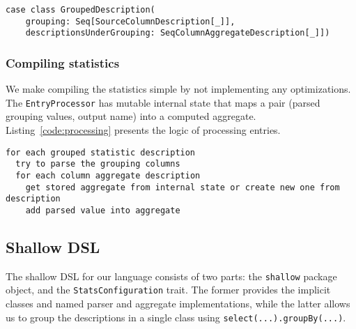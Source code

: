 \begin{lstlisting}[caption=GroupedDescription, label=code:grouped]
case class GroupedDescription(
	grouping: Seq[SourceColumnDescription[_]],
	descriptionsUnderGrouping: SeqColumnAggregateDescription[_]])
\end{lstlisting}

\subsubsection{Compiling statistics}
We make compiling the statistics simple by not implementing any optimizations. The \texttt{EntryProcessor} has mutable internal state that maps a pair (parsed grouping values, output name) into a computed aggregate. Listing~\ref{code:processing} presents the logic of processing entries.

\begin{lstlisting}[caption=Processing entries, label=code:processing,float,floatplacement=H]
for each grouped statistic description
  try to parse the grouping columns
  for each column aggregate description
    get stored aggregate from internal state or create new one from description
    add parsed value into aggregate
\end{lstlisting}

\subsection{Shallow DSL}

The shallow DSL for our language consists of two parts: the \texttt{shallow} package object, and the \texttt{StatsConfiguration} trait. The former provides the implicit classes and named parser and aggregate implementations, while the latter allows us to group the descriptions in a single class using \texttt{select(...).groupBy(...)}.

